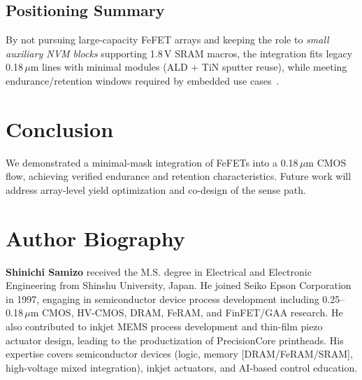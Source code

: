 \documentclass[journal]{IEEEtran}
\begin{document}
\subsection*{Positioning Summary}
By not pursuing large-capacity FeFET arrays and keeping the role to \emph{small auxiliary NVM blocks} supporting 1.8\,V SRAM macros, the integration fits legacy 0.18\,$\mu$m lines with minimal modules (ALD + TiN sputter reuse), while meeting endurance/retention windows required by embedded use cases~\cite{Mueller2015,Nakamura2003}.

\section{Conclusion}
We demonstrated a minimal-mask integration of FeFETs into a 0.18\,$\mu$m CMOS flow, achieving verified endurance and retention characteristics. Future work will address array-level yield optimization and co-design of the sense path.




\section*{Author Biography}
\textbf{Shinichi Samizo} received the M.S. degree in Electrical and Electronic Engineering from Shinshu University, Japan. He joined Seiko Epson Corporation in 1997, engaging in semiconductor device process development including 0.25–0.18\,$\mu$m CMOS, HV-CMOS, DRAM, FeRAM, and FinFET/GAA research. He also contributed to inkjet MEMS process development and thin-film piezo actuator design, leading to the productization of PrecisionCore printheads. His expertise covers semiconductor devices (logic, memory [DRAM/FeRAM/SRAM], high-voltage mixed integration), inkjet actuators, and AI-based control education.
\end{document}
